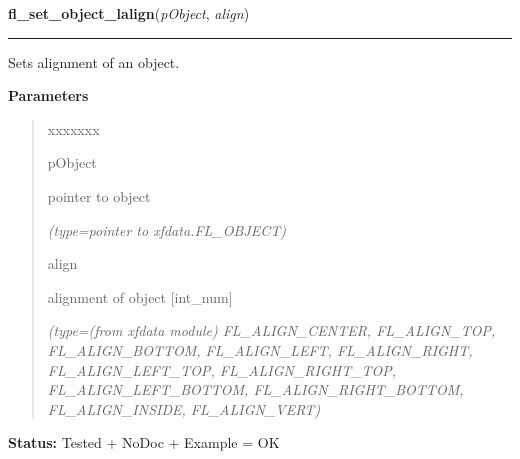 \hspace{.8\funcindent}\begin{boxedminipage}{\funcwidth}

    \raggedright \textbf{fl\_set\_object\_lalign}(\textit{pObject}, \textit{align})

    \vspace{-1.5ex}

    \rule{\textwidth}{0.5\fboxrule}
\setlength{\parskip}{2ex}
    Sets alignment of an object.

\setlength{\parskip}{1ex}
      \textbf{Parameters}
      \vspace{-1ex}

      \begin{quote}
        \begin{Ventry}{xxxxxxx}

          \item[pObject]

          pointer to object

            {\it (type=pointer to xfdata.FL\_OBJECT)}

          \item[align]

          alignment of object [int\_num]

            {\it (type=(from xfdata module) FL\_ALIGN\_CENTER, FL\_ALIGN\_TOP, FL\_ALIGN\_BOTTOM, 
FL\_ALIGN\_LEFT, FL\_ALIGN\_RIGHT, FL\_ALIGN\_LEFT\_TOP, 
FL\_ALIGN\_RIGHT\_TOP, FL\_ALIGN\_LEFT\_BOTTOM, FL\_ALIGN\_RIGHT\_BOTTOM, 
FL\_ALIGN\_INSIDE, FL\_ALIGN\_VERT)}

        \end{Ventry}

      \end{quote}

\textbf{Status:} Tested + NoDoc + Example = OK



    \end{boxedminipage}

    \label{xformslib:library:fl_get_object_lalign}

    \vspace{0.5ex}

